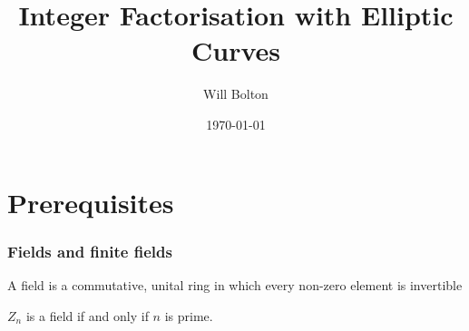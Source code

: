 \documentclass{beamer}
\title[Integer Factorisation with Elliptic Curves]{Integer Factorisation with Elliptic Curves}
\author{Will Bolton}
\date{\today}
\begin{document}
\titlepage
\section{Prerequisites}
\begin{frame}
\frametitle{Fields and finite fields}
\begin{definition}
	A field is a commutative, unital ring in which every non-zero element is invertible
\end{definition}
\begin{definition}
	$Z_n$ is a field if and only if $n$ is prime.
\end{definition}
\end{frame}
\end{document}
